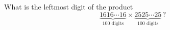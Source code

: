 What is the leftmost digit of the product
\[\underbrace{1616\cdots16}_{100\text{ digits}}\times\underbrace{2525\cdots25}_{100\text{ digits}}\,?\]
